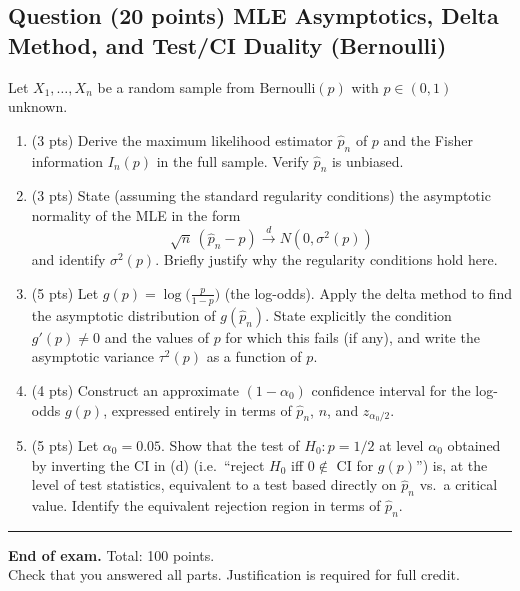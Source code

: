 \documentclass[11pt]{article}
\newcounter{qnum}
\newcommand{\question}[2]{\stepcounter{qnum}\subsection*{Question \theqnum \quad (#1 points) \hfill #2}}
\begin{document}
\question{20}{MLE Asymptotics, Delta Method, and Test/CI Duality (Bernoulli)}
Let $X_1,\ldots,X_n$ be a random sample from $\mathrm{Bernoulli}(p)$ with $p \in (0,1)$ unknown.

\begin{enumerate}[label=(\alph*),leftmargin=2em]
    \item (3 pts) Derive the maximum likelihood estimator $\hat p_n$ of $p$ and the Fisher information $I_n(p)$ in the full sample. Verify $\hat p_n$ is unbiased.
    \item (3 pts) State (assuming the standard regularity conditions) the asymptotic normality of the MLE in the form
    \[ \sqrt{n}\,(\hat p_n - p) \xrightarrow{d} N(0, \sigma^2(p)) \]
    and identify $\sigma^2(p)$. Briefly justify why the regularity conditions hold here.
    \item (5 pts) Let $g(p) = \log\!\bigl(\tfrac{p}{1-p}\bigr)$ (the log-odds). Apply the delta method to find the asymptotic distribution of $g(\hat p_n)$. State explicitly the condition $g'(p) \neq 0$ and the values of $p$ for which this fails (if any), and write the asymptotic variance $\tau^2(p)$ as a function of $p$.
    \item (4 pts) Construct an approximate $(1-\alpha_0)$ confidence interval for the log-odds $g(p)$, expressed entirely in terms of $\hat p_n$, $n$, and $z_{\alpha_0/2}$.
    \item (5 pts) Let $\alpha_0 = 0.05$. Show that the test of $H_0: p = 1/2$ at level $\alpha_0$ obtained by inverting the CI in (d) (i.e.\ ``reject $H_0$ iff $0 \notin$ CI for $g(p)$'') is, at the level of test statistics, equivalent to a test based directly on $\hat p_n$ vs.\ a critical value. Identify the equivalent rejection region in terms of $\hat p_n$.
\end{enumerate}

\bigskip
\hrule
\bigskip

\begin{center}
\textbf{End of exam.} \quad Total: 100 points.\\
Check that you answered all parts. Justification is required for full credit.
\end{center}
\end{document}
